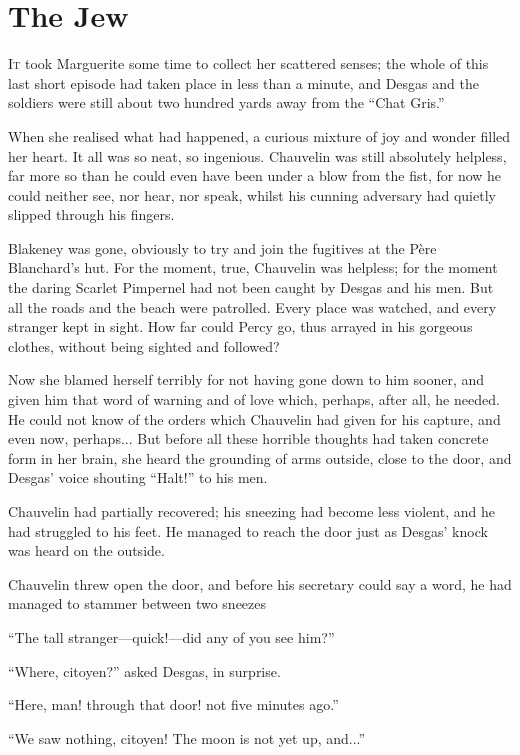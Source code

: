 
\chapter{The Jew}
\lettrine[lines=4]{I}{t} took Marguerite some time to collect her scattered senses; the whole of this last short episode had taken place in less than a minute, and Desgas and the soldiers were still about two hundred yards away from the \enquote{Chat Gris.}

When she realised what had happened, a curious mixture of joy and wonder filled her heart. It all was so neat, so ingenious. Chauvelin was still absolutely helpless, far more so than he could even have been under a blow from the fist, for now he could neither see, nor hear, nor speak, whilst his cunning adversary had quietly slipped through his fingers.

Blakeney was gone, obviously to try and join the fugitives at the Père Blanchard's hut. For the moment, true, Chauvelin was helpless; for the moment the daring Scarlet Pimpernel had not been caught by Desgas and his men. But all the roads and the beach were patrolled. Every place was watched, and every stranger kept in sight. How far could Percy go, thus arrayed in his gorgeous clothes, without being sighted and followed?

Now she blamed herself terribly for not having gone down to him sooner, and given him that word of warning and of love which, perhaps, after all, he needed. He could not know of the orders which Chauvelin had given for his capture, and even now, perhaps... But before all these horrible thoughts had taken concrete form in her brain, she heard the grounding of arms outside, close to the door, and Desgas’ voice shouting \enquote{Halt!} to his men.

Chauvelin had partially recovered; his sneezing had become less violent, and he had struggled to his feet. He managed to reach the door just as Desgas’ knock was heard on the outside.

Chauvelin threw open the door, and before his secretary could say a word, he had managed to stammer between two sneezes\longdash


\enquote{The tall stranger---quick!---did any of you see him?}

\enquote{Where, citoyen?} asked Desgas, in surprise.

\enquote{Here, man! through that door! not five minutes ago.}

\enquote{We saw nothing, citoyen! The moon is not yet up, and...}

